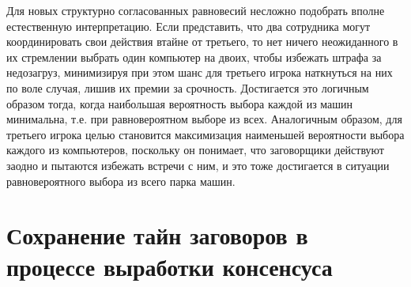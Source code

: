 
Для новых структурно согласованных равновесий несложно подобрать вполне естественную интерпретацию. Если представить, что два сотрудника могут координировать свои действия втайне от третьего, то нет ничего неожиданного в их стремлении выбрать один компьютер на двоих, чтобы избежать штрафа за недозагруз, минимизируя при этом шанс для третьего игрока наткнуться на них по воле случая, лишив их премии за срочность. Достигается это логичным образом тогда, когда наибольшая вероятность выбора каждой из машин минимальна, т.е. при равновероятном выборе из всех. Аналогичным образом, для третьего игрока целью становится максимизация наименьшей вероятности выбора каждого из компьютеров, поскольку он понимает, что заговорщики действуют заодно и пытаются избежать встречи с ним, и это тоже достигается в ситуации равновероятного выбора из всего парка машин.

\section{Сохранение тайн заговоров в процессе выработки консенсуса}\label{sec:ch2/sec6}

